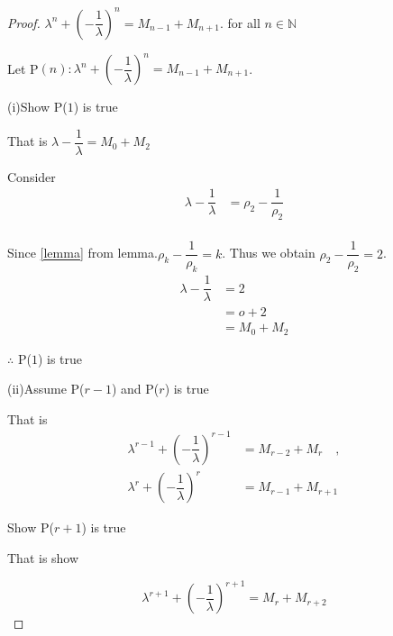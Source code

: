 \documentclass{rmutt-seminar}
\begin{document}
\begin{proof}
$\lambda^n + \left(-\dfrac{1}{\lambda}\right)^n = M_{n-1} + M_{n+1}$. for all $n \in \mathbb{N}$

\quad Let P$(n):\lambda^n + \left(-\dfrac{1}{\lambda}\right)^n = M_{n-1} + M_{n+1}$. 

\quad (i)\quad Show P($1$) is true 

\quad \quad \quad That is $\lambda - \dfrac{1}{\lambda} = M_{0} + M_{2}$ 

\quad \quad \quad Consider
\begin{align*}
 	\lambda - \dfrac{1}{\lambda} &= \rho_2 - \dfrac{1}{\rho_2}\\
 \end{align*}
 
\quad \quad \quad Since \eqref{lemma} from lemma.\quad $\rho_k-\dfrac{1}{\rho_k}=k$. Thus we obtain $\rho_2-\dfrac{1}{\rho_2}=2$.
 \begin{align*}
 	\lambda - \dfrac{1}{\lambda} &= 2\\
 	&= o + 2\\
 	&= M_{0} + M_{2}
 \end{align*}
 
\quad \quad \quad $\therefore$ P($1$) is true
 
\quad (ii)\quad Assume P($r-1$) and P($r$) is true

\quad \quad \quad That is 
\begin{align*}
	\lambda^{r-1} + \left(-\dfrac{1}{\lambda}\right)^{r-1} &= M_{r-2} + M_{r} \quad, \\
	\lambda^{r} + \left(-\dfrac{1}{\lambda}\right)^{r} &= M_{r-1} + M_{r+1}
\end{align*}

\quad \quad \quad Show P($r+1$) is true
 
\quad \quad \quad That is show 
 
$$ \lambda^{r+1} + \left(-\dfrac{1}{\lambda}\right)^{r+1}= M_{r} + M_{r+2} $$


\end{proof}
\end{document}
